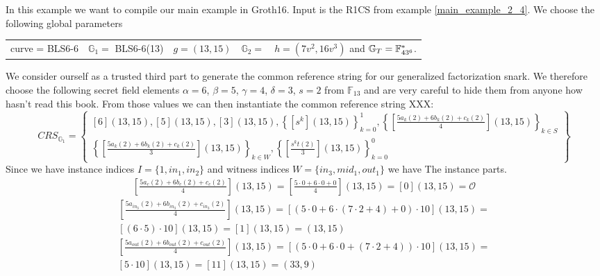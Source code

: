 \begin{example}
\label{main_example_2_5}
In this example we want to compile our main example in Groth16. Input is the R1CS from example \ref{main_example_2_4}. We choose the following global parameters

\begin{tabular}{ccccc}
\\
curve = BLS6-6 & $\mathbb{G}_1=$ BLS6-6(13) & $g = (13,15) $
& $\mathbb{G}_2=$ & $h=(7v^2,16v^3)$ and $\mathbb{G}_T = \mathbb{F}_{43^6}^*$.
\end{tabular} 
\end{example}
\begin{example}
We consider ourself as a trusted third part to generate the common reference string for our generalized factorization snark. We therefore choose the following secret field elements $\alpha=6$, $\beta=5$, $\gamma=4$, $\delta=3$, $s=2$ from $\mathbb{F}_{13}$ and are very careful to hide them from anyone how hasn't read this book. From those values we can then instantiate the common reference string XXX:
$$
CRS_{\mathbb{G}_{1}}=\left\{ \begin{array}{c}
[6](13,15),[5](13,15),[3](13,15),\left\{ [s^{k}](13,15)\right\} _{k=0}^{1},\left\{ [\frac{5 a_{k}(2)+6 b_{k}(2)+c_{k}(2)}{4}](13,15)\right\} _{k\in S}\\
\left\{ [\frac{5 a_{k}(2)+6 b_{k}(2)+c_{k}(2)}{3}](13,15)\right\} _{k\in W},\left\{ [\frac{s^{k}t(2)}{3}](13,15)\right\} _{k=0}^{0}
\end{array}\right\}
$$
Since we have instance indices $I=\{1, in_1,in_2\}$ and witness indices $W=\{in_3,mid_1,out_1\}$ we have 
The instance parts.
\begin{multline*}
\left[\frac{5 a_{c}(2)+6 b_{c}(2)+c_{c}(2)}{4}\right](13,15) = 
\left[\frac{5\cdot 0 +6\cdot 0 + 0 }{4}\right](13,15) =
\left[0\right](13,15) = \mathcal{O}
\end{multline*}
\begin{multline*}
\left[\frac{5 a_{in_3}(2)+6 b_{in_3}(2)+c_{in_3}(2)}{4}\right](13,15) =
\left[(5\cdot 0+6\cdot(7\cdot 2 +4)+0)\cdot 10\right](13,15) =\\
\left[(6\cdot 5 )\cdot 10\right](13,15) =
\left[1\right](13,15) =
(13,15)
\end{multline*}
\begin{multline*}
\left[\frac{5 a_{out}(2)+6 b_{out}(2)+c_{out}(2)}{4}\right](13,15) = 
\left[(5\cdot 0 +6\cdot 0 + (7\cdot 2 + 4))\cdot 10 \right](13,15) =\\
\left[5\cdot 10 \right](13,15) =
\left[11\right](13,15) = 
(33,9)
\end{multline*}


\end{example}
